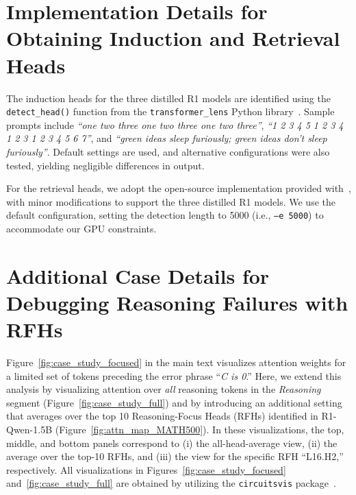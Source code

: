 \documentclass[11pt]{article}
\begin{document}
\section{Implementation Details for Obtaining Induction and Retrieval Heads}
\label{app:top_10_induction_retrieval_heads}

The induction heads for the three distilled R1 models are identified using the \texttt{detect\_head()} function from the \texttt{transformer\_lens} Python library~\cite{nanda2022transformerlens}. Sample prompts include \textit{``one two three one two three one two three''}, \textit{``1 2 3 4 5 1 2 3 4 1 2 3 1 2 3 4 5 6 7''}, and \textit{``green ideas sleep furiously; green ideas don't sleep furiously''}. Default settings are used, and alternative configurations were also tested, yielding negligible differences in output.

For the retrieval heads, we adopt the open-source implementation provided with~\cite{wu2024retrievalheadmechanisticallyexplains}, with minor modifications to support the three distilled R1 models. We use the default configuration, setting the detection length to 5000 (i.e., \texttt{--e 5000}) to accommodate our GPU constraints.

\section{Additional Case Details for Debugging Reasoning Failures with RFHs}
\label{app:case_study_failure}

Figure~\ref{fig:case_study_focused} in the main text visualizes attention weights for a limited set of tokens preceding the error phrase ``\textit{C is 0}.'' Here, we extend this analysis by visualizing attention over \emph{all} reasoning tokens in the \textit{Reasoning} segment (Figure~\ref{fig:case_study_full}) and by introducing an additional setting that averages over the top 10 Reasoning-Focus Heads (RFHs) identified in R1-Qwen-1.5B (Figure~\ref{fig:attn_map_MATH500}). In these visualizations, the top, middle, and bottom panels correspond to (i) the all-head-average view, (ii) the average over the top-10 RFHs, and (iii) the view for the specific RFH ``L16.H2,'' respectively. All visualizations in Figures~\ref{fig:case_study_focused} and~\ref{fig:case_study_full} are obtained by utilizing the \texttt{circuitsvis} package~\cite{cooney2023circuitsvis}.
\end{document}
